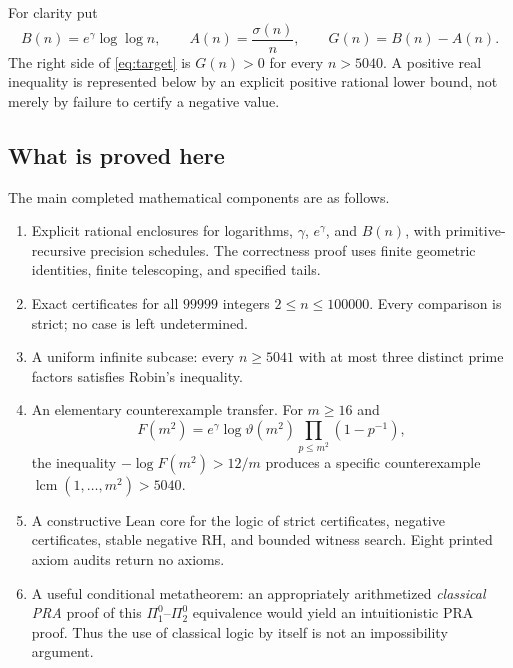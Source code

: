 \documentclass[11pt,a4paper]{article}
\theoremstyle{definition}
\begin{document}
For clarity put
\begin{equation}\label{eq:gap}
 B(n)=e^\gamma\log\log n,\qquad
 A(n)=\frac{\sigma(n)}n,\qquad
 G(n)=B(n)-A(n).
\end{equation}
The right side of \eqref{eq:target} is $G(n)>0$ for every $n>5040$.
A positive real inequality is represented below by an explicit positive
rational lower bound, not merely by failure to certify a negative value.

\subsection{What is proved here}

The main completed mathematical components are as follows.
\begin{enumerate}[leftmargin=*]
\item Explicit rational enclosures for logarithms, $\gamma$, $e^\gamma$,
and $B(n)$, with primitive-recursive precision schedules. The correctness
proof uses finite geometric identities, finite telescoping, and specified
tails.
\item Exact certificates for all $99999$ integers $2\le n\le100000$.
Every comparison is strict; no case is left undetermined.
\item A uniform infinite subcase: every $n\ge5041$ with at most three
distinct prime factors satisfies Robin's inequality.
\item An elementary counterexample transfer. For $m\ge16$ and
\[
 F(m^2)=e^\gamma\log\vartheta(m^2)
        \prod_{p\le m^2}(1-p^{-1}),
\]
the inequality $-\log F(m^2)>12/m$ produces a specific counterexample
$\operatorname{lcm}(1,\ldots,m^2)>5040$.
\item A constructive Lean core for the logic of strict certificates,
negative certificates, stable negative RH, and bounded witness search.
Eight printed axiom audits return no axioms.
\item A useful conditional metatheorem: an appropriately arithmetized
\emph{classical PRA} proof of this $\Pi^0_1$--$\Pi^0_2$ equivalence would
yield an intuitionistic PRA proof. Thus the use of classical logic by
itself is not an impossibility argument.
\end{enumerate}
\end{document}
